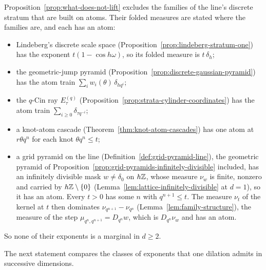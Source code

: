 Proposition~\ref{prop:what-does-not-lift} excludes the families of the line's discrete stratum that
are built on atoms. Their folded \Levy{} measures are stated where the families are, and each has an
atom:
\begin{itemize}
\item Lindeberg's discrete scale space (Proposition~\ref{prop:lindeberg-stratum-one}) has the
exponent $t(1 - \cos h\omega)$, so its folded \Levy{} measure is $t\,\delta_h$;
\item the geometric-jump pyramid (Proposition~\ref{prop:discrete-gaussian-pyramid}) has the atom
train $\sum_iw_i(\theta)\,\delta_{hq^i}$;
\item the $q$-Cin ray $E^{(q)}_\tau$ (Proposition~\ref{prop:strata-cylinder-coordinates}) has the atom
train $\sum_{i \ge 0}\delta_{\tau q^{-i}}$;
\item a knot-atom cascade (Theorem~\ref{thm:knot-atom-cascades}) has one atom at $r\theta q^n$ for
each knot $\theta q^n \le t$;
\item a grid pyramid on the line (Definition~\ref{def:grid-pyramid-line}), the geometric pyramid of
Proposition~\ref{prop:grid-pyramids-infinitely-divisible} included, has an infinitely divisible
mask $w \ne \delta_0$ on $h\mathbb{Z}$, whose \Levy{} measure $\nu_w$ is finite, nonzero and carried by
$h\mathbb{Z} \setminus \{0\}$ (Lemma~\ref{lem:lattice-infinitely-divisible} at $d = 1$), so it has an
atom. Every $t > 0$ has some $n$ with $q^{n+1} \le t$. The \Levy{} measure $\nu_t$ of the kernel at
$t$ then dominates $\nu_{q^{n+1}} - \nu_{q^n}$ (Lemma~\ref{lem:family-structure}), the \Levy{}
measure of the step $\mu_{q^n,q^{n+1}} = D_{q^n}w$, which is $D_{q^n}\nu_w$ and has an atom.
\end{itemize}
So none of their exponents is a marginal in $d \ge 2$.

The next statement compares the classes of exponents that one dilation admits in successive
dimensions.

